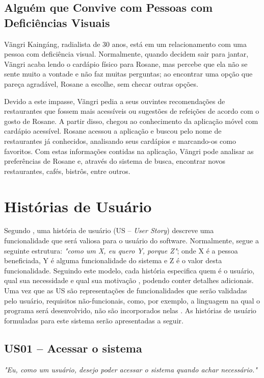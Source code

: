\subsection{Alguém que Convive com Pessoas com Deficiências Visuais}
Vãngri Kaingáng, radialista de 30 anos, está em um relacionamento com uma pessoa com deficiência visual. Normalmente, quando decidem sair para jantar, Vãngri acaba lendo o cardápio físico para Rosane, mas percebe que ela não se sente muito a vontade e não faz muitas perguntas; ao encontrar uma opção que pareça agradável, Rosane a escolhe, sem checar outras opções.

Devido a este impasse, Vãngri pedia a seus ouvintes recomendações de restaurantes que fossem mais acessíveis ou sugestões de refeições de acordo com o gosto de Rosane. A partir disso, chegou ao conhecimento da aplicação móvel com cardápio acessível. Rosane acessou a aplicação e buscou pelo nome de restaurantes já conhecidos, analisando seus cardápios e marcando-os como favoritos. Com estas informações contidas na aplicação, Vãngri pode analisar as preferências de Rosane e, através do sistema de busca, encontrar novos restaurantes, cafés, bistrôs, entre outros.

\section{Histórias de Usuário}

Segundo \cite{COHN2004}, uma história de usuário (US -- \emph{User Story}) descreve uma funcionalidade que será valiosa para o usuário do software. Normalmente, segue a seguinte estrutura: \textit{"como um X, eu quero Y, porque Z"}; onde X é a pessoa beneficiada, Y é alguma funcionalidade do sistema e Z é o valor desta funcionalidade. Seguindo este modelo, cada história especifica quem é o usuário, qual sua necessidade e qual sua motivação \cite{AUDY2015}, podendo conter detalhes adicionais. Uma vez que as US são representações de funcionalidades que serão validadas pelo usuário, requisitos não-funcionais, como, por exemplo, a linguagem na qual o programa será desenvolvido, não são incorporados nelas \cite{COHN2004}. As histórias de usuário formuladas para este sistema serão apresentadas a seguir.

\subsection{US01 -- Acessar o sistema}

\textit{"Eu, como um usuário, desejo poder acessar o sistema quando achar necessário."}

